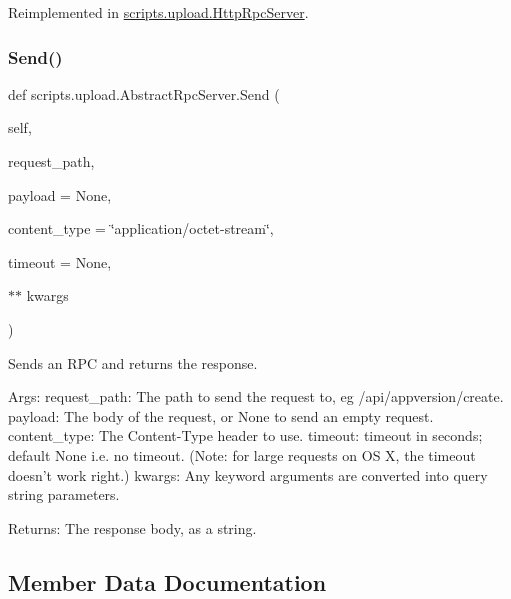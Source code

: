 Reimplemented in \mbox{\hyperlink{classscripts_1_1upload_1_1_http_rpc_server_a44de63ab67503b0d11fd37c1c3a22124}{scripts.\+upload.\+Http\+Rpc\+Server}}.

\mbox{\label{classscripts_1_1upload_1_1_abstract_rpc_server_ae5ceef254ccc39b0b7d30eb0a3d2d465}} 
\subsubsection{\texorpdfstring{Send()}{Send()}}
{\footnotesize\ttfamily def scripts.\+upload.\+Abstract\+Rpc\+Server.\+Send (\begin{DoxyParamCaption}\item[{}]{self,  }\item[{}]{request\+\_\+path,  }\item[{}]{payload = {\ttfamily None},  }\item[{}]{content\+\_\+type = {\ttfamily \char`\"{}application/octet-\/stream\char`\"{}},  }\item[{}]{timeout = {\ttfamily None},  }\item[{$\ast$$\ast$}]{kwargs }\end{DoxyParamCaption})}

\begin{DoxyVerb}Sends an RPC and returns the response.

Args:
  request_path: The path to send the request to, eg /api/appversion/create.
  payload: The body of the request, or None to send an empty request.
  content_type: The Content-Type header to use.
  timeout: timeout in seconds; default None i.e. no timeout.
(Note: for large requests on OS X, the timeout doesn't work right.)
  kwargs: Any keyword arguments are converted into query string parameters.

Returns:
  The response body, as a string.
\end{DoxyVerb}
 

\subsection{Member Data Documentation}
\mbox{\label{classscripts_1_1upload_1_1_abstract_rpc_server_a994e096aae3befc19a171e4a530efe3f}} 
